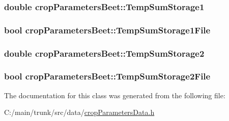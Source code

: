 \hypertarget{classcrop_parameters_beet_a5c3de50f024316c4f4dc7147d1fe0580}{
\subsubsection[{TempSumStorage1}]{\setlength{\rightskip}{0pt plus 5cm}double {\bf cropParametersBeet::TempSumStorage1}}}
\label{classcrop_parameters_beet_a5c3de50f024316c4f4dc7147d1fe0580}
\hypertarget{classcrop_parameters_beet_a2dc5bebb7c4457b96ae65ddd53d72568}{
\subsubsection[{TempSumStorage1File}]{\setlength{\rightskip}{0pt plus 5cm}bool {\bf cropParametersBeet::TempSumStorage1File}}}
\label{classcrop_parameters_beet_a2dc5bebb7c4457b96ae65ddd53d72568}
\hypertarget{classcrop_parameters_beet_a342acb344ba25158de816f8ac75d312b}{
\subsubsection[{TempSumStorage2}]{\setlength{\rightskip}{0pt plus 5cm}double {\bf cropParametersBeet::TempSumStorage2}}}
\label{classcrop_parameters_beet_a342acb344ba25158de816f8ac75d312b}
\hypertarget{classcrop_parameters_beet_aea67fec8f633b227a0eb7b9386307b2e}{
\subsubsection[{TempSumStorage2File}]{\setlength{\rightskip}{0pt plus 5cm}bool {\bf cropParametersBeet::TempSumStorage2File}}}
\label{classcrop_parameters_beet_aea67fec8f633b227a0eb7b9386307b2e}


The documentation for this class was generated from the following file:\begin{DoxyCompactItemize}
\item 
C:/main/trunk/src/data/\hyperlink{crop_parameters_data_8h}{cropParametersData.h}\end{DoxyCompactItemize}

